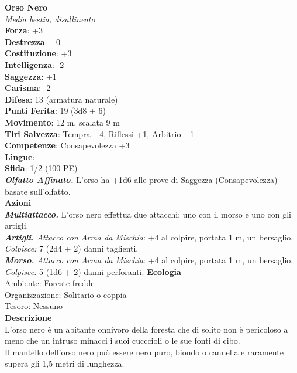 \begin{multicols}{2}
\medskip\textbf{Orso Nero}\\
\emph{Media bestia, disallineato}\\
\textbf{Forza}: +3\\
\textbf{Destrezza}: +0\\
\textbf{Costituzione}: +3\\
\textbf{Intelligenza}: -2\\
\textbf{Saggezza}: +1\\
\textbf{Carisma}: -2\\
\textbf{Difesa}: 13 (armatura naturale)\\
\textbf{Punti Ferita}: 19 (3d8 + 6)\\
\textbf{Movimento}: 12 m, scalata 9 m\\
\textbf{Tiri Salvezza}: Tempra +4, Riflessi +1, Arbitrio +1 \\
\textbf{Competenze}: Consapevolezza +3\\
\textbf{Lingue}: -\\
\textbf{Sfida}: 1/2 (100 PE)\smallskip\\
\emph{\textbf{Olfatto Affinato.}} L'orso ha +1d6 alle prove di Saggezza (Consapevolezza) basate sull'olfatto.\\
\smallskip\textbf{Azioni}\\
\emph{\textbf{Multiattacco.}} L'orso nero effettua due attacchi: uno con il morso e uno con gli artigli.\\
\emph{\textbf{Artigli.} Attacco con Arma da Mischia}: +4 al colpire, portata 1 m, un bersaglio.\\
\emph{Colpisce:} 7 (2d4 + 2) danni taglienti.\\
\emph{\textbf{Morso.} Attacco con Arma da Mischia}: +4 al colpire, portata 1 m, un bersaglio.\\
\emph{Colpisce:} 5 (1d6 + 2) danni perforanti.
\textbf{Ecologia}\\
Ambiente: Foreste fredde\\
Organizzazione: Solitario o coppia\\
Tesoro: Nessuno\\
\textbf{Descrizione}\\
L'orso nero è un abitante onnivoro della foresta che di solito non è pericoloso a meno che un intruso minacci i suoi cucccioli o le sue fonti di cibo.\\
Il mantello dell'orso nero può essere nero puro, biondo o cannella e raramente supera gli 1,5 metri di lunghezza. \\



\end{multicols}
